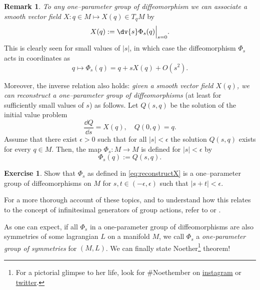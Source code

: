 \documentclass[english,fontsize=11pt,paper=b5]{scrbook}
\numberwithin{equation}{chapter}
\theoremstyle{definition}
\newtheorem{remark}{Remark}[chapter]
\newtheorem{exercise}{Exercise}[chapter]
\begin{document}
    \begin{remark}
      \emph{To any one--parameter group of diffeomorphism we can associate a smooth vector field $X : q\in M \mapsto X(q)\in T_qM$} by
      \begin{equation}
        X(q) := \dv{s} \Phi_s(q) \Big|_{s=0}.
      \end{equation}
      This is clearly seen for small values of $|s|$, in which case the diffeomorphism $\Phi_s$ acts in coordinates as
      \begin{equation}\label{eq:infinitesimalSymmetryExp}
        q \mapsto \Phi_s(q) = q + s X(q) + O(s^2).
      \end{equation}

      Moreover, the inverse relation also holds: \emph{given a smooth vector field $X(q)$, we can reconstruct a one--parameter group of diffeomorphisms} (at least for sufficiently small values of $s$) as follows.
      Let $Q(s, q)$ be the solution of the initial value problem
      \begin{equation}\label{eq:NoetherCoords}
        \frac{\dd Q}{\dd s} = X(q), \quad Q(0, q) = q.
      \end{equation}
      Assume that there exist $\epsilon >0$ such that for all $|s|<\epsilon$ the solution $Q(s,q)$ exists for every $q\in M$.
      Then, the map $\Phi_s:M\to M$ is defined for $|s|<\epsilon$ by
      \begin{equation}\label{eq:reconstructX}
        \Phi_s(q) := Q(s, q).
      \end{equation}

      \begin{exercise}
        Show that $\Phi_s$ as defined in \eqref{eq:reconstructX} is a one--parameter group of diffeomorphisms on $M$ for $s,t \in(-\epsilon,\epsilon)$ such that $|s + t| < \epsilon$.
      \end{exercise}

      For a more thorough account of these topics, and to understand how this relates to the concept of infinitesimal generators of group actions, refer to \cite[Chapters 9 and 20]{book:lee} or \cite[Chapters 3 and 4]{lectures:aom:seri}.
    \end{remark}

    As one can expect, if all $\Phi_s$ in a one-parameter group of diffeomorphisms are also symmetries of some lagrangian $L$ on a manifold $M$, we call $\Phi_s$ a \emph{one-parameter group of symmetries} for $(M,L)$. We can finally state Noether\footnote{For a pictorial glimpse to her life, look for \#Noethember on \href{https://www.instagram.com/explore/tags/noethember/}{instagram} or \href{https://twitter.com/search?q=noethember}{twitter}.} theorem!
\end{document}
